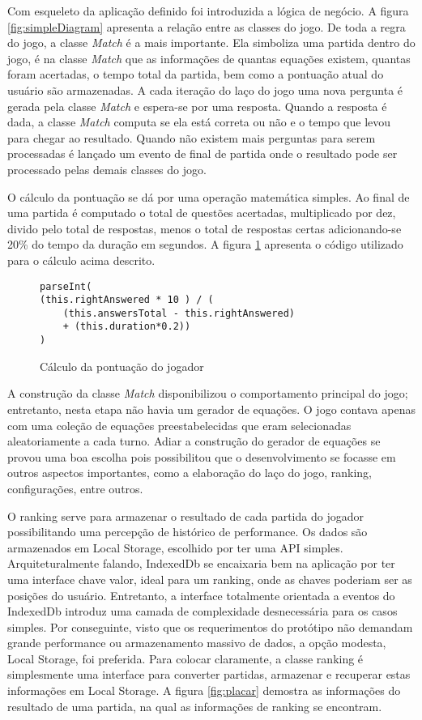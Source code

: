 Com esqueleto da aplicação definido foi introduzida a lógica
de negócio. A figura \ref{fig:simpleDiagram} apresenta a
relação entre as classes do jogo. De toda a regra do jogo, a classe
\textit{Match} é a mais importante. Ela simboliza uma partida dentro
do jogo, é na classe \textit{Match} que as informações de quantas
equações existem, quantas foram acertadas, o tempo total da partida,
bem como a pontuação atual do usuário são armazenadas. A cada
iteração do laço do jogo uma nova pergunta é gerada pela classe
\textit{Match} e espera-se por uma resposta. Quando a resposta é dada,
a classe \textit{Match} computa se ela está correta ou não e
o tempo que levou para chegar ao resultado. Quando não existem mais
perguntas para serem processadas é lançado um evento de final de
partida onde o resultado pode ser processado pelas demais classes do
jogo.

O cálculo da pontuação se dá por uma operação matemática simples.
Ao final de uma partida é computado o total de questões acertadas,
multiplicado por dez, divido pelo total de respostas, menos o total de
respostas certas adicionando-se 20\% do tempo da duração em segundos.
A figura \ref{fig:punctuationCalculation} apresenta o código utilizado
para o cálculo acima descrito.

\begin{figure}[H]
\centering
\begin{verbatim}
parseInt(
(this.rightAnswered * 10 ) / (
    (this.answersTotal - this.rightAnswered) 
    + (this.duration*0.2))
)
\end{verbatim}
\caption{Cálculo da pontuação do jogador}
\label{fig:punctuationCalculation}
\end{figure}

A construção da classe \textit{Match} disponibilizou o comportamento
principal do jogo; entretanto, nesta etapa não havia um gerador de
equações. O jogo contava apenas com uma coleção de equações
preestabelecidas que eram selecionadas aleatoriamente a cada turno.
Adiar a construção do gerador de equações se provou uma boa
escolha pois possibilitou que o desenvolvimento se focasse em outros
aspectos importantes, como a elaboração do laço do jogo, ranking,
configurações, entre outros.

O ranking serve para armazenar o resultado de cada partida do jogador
possibilitando uma percepção de histórico de performance. Os
dados são armazenados em Local Storage, escolhido por ter uma API
simples. Arquiteturalmente falando, IndexedDb se encaixaria bem na
aplicação por ter uma interface chave valor, ideal para um ranking,
onde as chaves poderiam ser as posições do usuário. Entretanto, a
interface totalmente orientada a eventos do IndexedDb introduz uma
camada de complexidade desnecessária para os casos simples. Por
conseguinte, visto que os requerimentos do protótipo não demandam
grande performance ou armazenamento massivo de dados, a opção
modesta, Local Storage, foi preferida. Para colocar claramente, a
classe ranking é simplesmente uma interface para converter partidas,
armazenar e recuperar estas informações em Local Storage. A figura
\ref{fig:placar} demostra as informações do resultado de uma partida,
na qual as informações de ranking se encontram.

